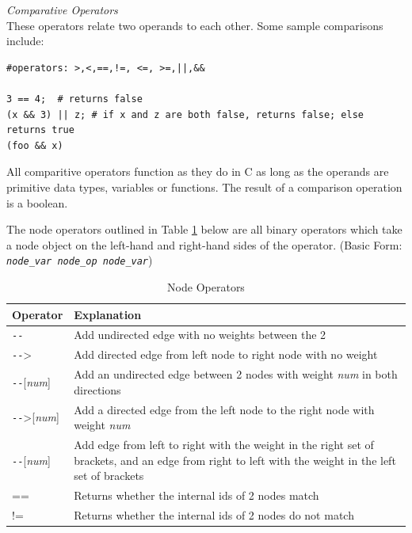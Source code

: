 \documentclass{article}
\newcommand{\code}[1]{\texttt{#1}} %
\begin{document}
\emph{Comparative Operators} \\
These operators relate two operands to each other. Some sample comparisons include: 
\begin{lstlisting}[language=pltLang, caption=Declaration of ``string'' types., label=lst:ops]
#operators: >,<,==,!=, <=, >=,||,&&

3 == 4;  # returns false
(x && 3) || z; # if x and z are both false, returns false; else returns true
(foo && x)
\end{lstlisting}

All comparitive operators function as they do in C as long as the operands are primitive data types, variables or functions. The result of a comparison operation is a boolean. 


The node operators outlined in Table \ref{tbl:node-ops} below are all binary operators which take a node object on the left-hand and right-hand sides of the operator.  (Basic Form: \code{\emph{node\_var} \emph{node\_op} \emph{node\_var}})

\begin{table}[H]
\centering
\begin{tabular}{| p{1.5in} | p{2.75in} |}
\hline
Operator & Explanation \\
\hline
\texttt{-{}-} & Add undirected edge with no weights between the 2 \\
\hline
\texttt{-{}-}> & Add directed edge from left node to right node with no weight \\
\hline
\texttt{-{}-}[\emph{num}] & Add an undirected edge between 2 nodes with weight \emph{num} in both directions \\
\hline
\texttt{-{}-}>[\emph{num}] & Add a directed edge from the left node to the right node with weight \emph{num} \\
\hline
[\emph{num}]\texttt{-{}-}[\emph{num}] & Add edge from left to right with the weight in the right set of brackets, and an edge from right to left with the weight in the left set of brackets \\
\hline
== & Returns whether the internal ids of 2 nodes match \\
\hline
!= & Returns whether the internal ids of 2 nodes do not match \\
\hline
\end{tabular}
\caption{Node Operators}
\label{tbl:node-ops}
\end{table}
\end{document}
